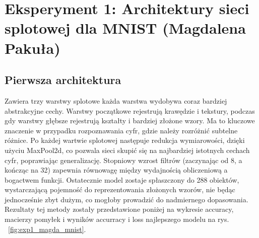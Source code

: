 \documentclass[10pt]{article}
\begin{document}
\pagebreak
\section{Eksperyment 1: Architektury sieci splotowej dla MNIST (Magdalena Pakuła)}\label{sec:ex1-pakula_mnist}

\subsection*{Pierwsza architektura}
Zawiera trzy warstwy splotowe każda warstwa wydobywa coraz bardziej abstrakcyjne cechy. Warstwy początkowe rejestrują krawędzie i tekstury, podczas gdy warstwy głębsze rejestrują kształty i bardziej złożone wzory. Ma to kluczowe znaczenie w przypadku rozpoznawania cyfr, gdzie należy rozróżnić subtelne różnice.
Po każdej wartwie splotowej następuje redukcja wymiarowości, dzięki użyciu MaxPool2d, co pozwala sieci skupić się na najbardziej istotnych cechach cyfr, poprawiając generalizację.
Stopniowy wzrost filtrów (zaczynając od 8, a kończąc na 32) zapewnia równowagę między wydajnością obliczeniową a bogactwem funkcji.
Ostatecznie model zostaje spłaszczony do 288 obiektów, wystarczającą pojemność do reprezentowania złożonych wzorów, nie będąc jednocześnie zbyt dużym, co mogłoby prowadzić do nadmiernego dopasowania.
Rezultaty tej metody zostały przedstawione poniżej na wykresie accuracy, macierzy pomyłek i wyników accurracy i loss najlepszego modelu na rys. ~\ref{fig:exp1_magda_mnist}.

\MagdaMnistLarge{}
\end{document}
